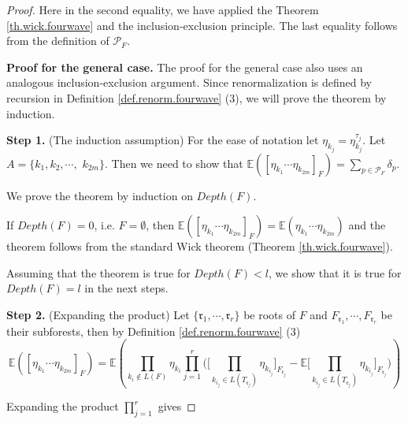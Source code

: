 \begin{proof}
 Here in the second equality, we have applied the Theorem \ref{th.wick.fourwave} and the inclusion-exclusion principle. The last equality follows from the definition of $\mathcal{P}_F$.
 
 \textbf{Proof for the general case.} The proof for the general case also uses an analogous inclusion-exclusion argument. Since renormalization is defined by recursion in Definition \ref{def.renorm.fourwave} (3), we will prove the theorem by induction. 
 
 \textbf{Step 1.} (The induction assumption) For the ease of notation let $\eta_{k_j}=\eta^{\tau_j}_{k_j}$. Let $A=\{k_1,k_2,\cdots,$ $k_{2m}\}$. Then we need to show that $\mathbb{E}([\eta_{k_1}\cdots \eta_{k_{2m}}]_F)=\sum_{p\in \mathcal{P}_F}\delta_p$.
 
 We prove the theorem by induction on $Depth(F)$.
 
 If $Depth(F)=0$, i.e. $F=\emptyset$, then $\mathbb{E}([\eta_{k_1}\cdots \eta_{k_{2m}}]_F)=\mathbb{E}(\eta_{k_1}\cdots \eta_{k_{2m}})$ and the theorem follows from the standard Wick theorem (Theorem \ref{th.wick.fourwave}).
 
 Assuming that the theorem is true for $Depth(F)<l$, we show that it is true for $Depth(F)=l$ in the next steps.
 
 \textbf{Step 2.} (Expanding the product) Let $\{\mathfrak{r}_1,\cdots, \mathfrak{r}_r\}$ be roots of $F$ and $F_{\mathfrak{r}_1},\cdots,F_{\mathfrak{r}_r}$ be their subforests, then by Definition \ref{def.renorm.fourwave} (3)
 \begin{equation}
  \mathbb{E}([\eta_{k_1}\cdots \eta_{k_{2m}}]_F)=\mathbb{E}\left(\prod_{k_i\notin L(F)} \eta_{k_i} \prod_{j=1}^r \Bigg(\Bigg[\prod_{k_{i_j}\in L(T_{\mathfrak{r}_j})}\eta_{k_{i_j}}\Bigg]_{F_{\mathfrak{r}_j}}-\mathbb{E}\Bigg[\prod_{k_{i_j}\in L(T_{\mathfrak{r}_j})}\eta_{k_{i_j}}\Bigg]_{F_{\mathfrak{r}_j}}\Bigg)\right)
 \end{equation}
 
 
 Expanding the product $\prod_{j=1}^r$ gives
 

\end{proof}
